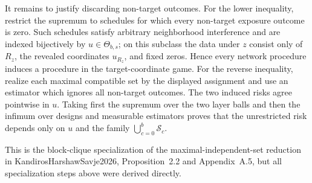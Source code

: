 It remains to justify discarding non-target outcomes.  For the lower inequality, restrict the supremum to schedules for which every non-target exposure outcome is zero.  Such schedules satisfy arbitrary neighborhood interference and are indexed bijectively by \(u\in\Theta_{b,s}\); on this subclass the data under \(z\) consist only of \(R_z\), the revealed coordinates \(u_{R_z}\), and fixed zeros.  Hence every network procedure induces a procedure in the target-coordinate game.  For the reverse inequality, realize each maximal compatible set by the displayed assignment and use an estimator which ignores all non-target outcomes.  The two induced risks agree pointwise in \(u\).  Taking first the supremum over the two layer balls and then the infimum over designs and measurable estimators proves that the unrestricted risk depends only on \(u\) and the family \(\bigcup_{c=0}^b\mathcal S_c\).

This is the block-clique specialization of the maximal-independent-set reduction in KandirosHarshawSavje2026, Proposition~2.2 and Appendix~A.5, but all specialization steps above were derived directly.